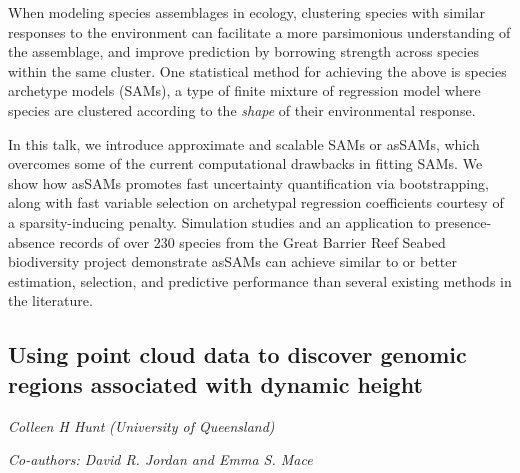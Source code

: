 \documentclass[
]{scrreprt}
\begin{document}
\setlength{\parskip}{0.5em}

When modeling species assemblages in ecology, clustering species with
similar responses to the environment can facilitate a more parsimonious
understanding of the assemblage, and improve prediction by borrowing
strength across species within the same cluster. One statistical method
for achieving the above is species archetype models (SAMs), a type of
finite mixture of regression model where species are clustered according
to the \emph{shape} of their environmental response.

In this talk, we introduce approximate and scalable SAMs or asSAMs,
which overcomes some of the current computational drawbacks in fitting
SAMs. We show how asSAMs promotes fast uncertainty quantification via
bootstrapping, along with fast variable selection on archetypal
regression coefficients courtesy of a sparsity-inducing penalty.
Simulation studies and an application to presence-absence records of
over 230 species from the Great Barrier Reef Seabed biodiversity project
demonstrate asSAMs can achieve similar to or better estimation,
selection, and predictive performance than several existing methods in
the literature.

\subsection{Using point cloud data to discover genomic regions
associated with dynamic
height}\label{using-point-cloud-data-to-discover-genomic-regions-associated-with-dynamic-height}

\emph{Colleen H Hunt} \emph{(University of
Queensland)}

\emph{Co-authors: David R. Jordan and Emma S. Mace}

\setlength{\parskip}{0.5em}
\end{document}
